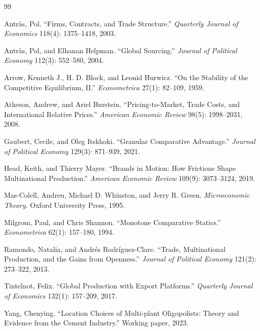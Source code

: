 \documentclass[11pt]{article}
\begin{document}
\setlength{\bibsep}{1pt}
\begin{thebibliography}{99}

Antr\`as, Pol. ``Firms, Contracts, and Trade Structure.'' \emph{Quarterly Journal of
Economics} 118(4): 1375--1418, 2003.

Antr\`as, Pol, and Elhanan Helpman. ``Global Sourcing.'' \emph{Journal of Political
Economy} 112(3): 552--580, 2004.

Arrow, Kenneth J., H. D. Block, and Leonid Hurwicz. ``On the Stability of the
Competitive Equilibrium, II.'' \emph{Econometrica} 27(1): 82--109, 1959.

Atkeson, Andrew, and Ariel Burstein. ``Pricing-to-Market, Trade Costs, and
International Relative Prices.'' \emph{American Economic Review} 98(5): 1998--2031,
2008.

Gaubert, Cecile, and Oleg Itskhoki. ``Granular Comparative Advantage.'' \emph{Journal
of Political Economy} 129(3): 871--939, 2021.

Head, Keith, and Thierry Mayer. ``Brands in Motion: How Frictions Shape Multinational
Production.'' \emph{American Economic Review} 109(9): 3073--3124, 2019.

Mas-Colell, Andreu, Michael D. Whinston, and Jerry R. Green. \emph{Microeconomic
Theory}. Oxford University Press, 1995.

Milgrom, Paul, and Chris Shannon. ``Monotone Comparative Statics.''
\emph{Econometrica} 62(1): 157--180, 1994.

Ramondo, Natalia, and Andr\'es Rodr\'iguez-Clare. ``Trade, Multinational Production,
and the Gains from Openness.'' \emph{Journal of Political Economy} 121(2): 273--322,
2013.

Tintelnot, Felix. ``Global Production with Export Platforms.'' \emph{Quarterly Journal
of Economics} 132(1): 157--209, 2017.

Yang, Chenying. ``Location Choices of Multi-plant Oligopolists: Theory and Evidence
from the Cement Industry.'' Working paper, 2023.

\end{thebibliography}
\end{document}

